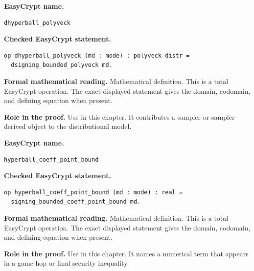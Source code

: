\begin{formaldefinition}
\noindent\textbf{EasyCrypt name.}
\begin{lstlisting}[language=EasyCrypt,basicstyle=\ttfamily\scriptsize]
dhyperball_polyveck
\end{lstlisting}
\noindent\textbf{Checked EasyCrypt statement.}
\begin{lstlisting}[language=EasyCrypt,basicstyle=\ttfamily\scriptsize]
op dhyperball_polyveck (md : mode) : polyveck distr =
  dsigning_bounded_polyveck md.
\end{lstlisting}
\noindent\textbf{Formal mathematical reading.}
Mathematical definition. This is a total EasyCrypt operation.  The exact displayed statement gives the domain, codomain, and defining equation when present.

\noindent\textbf{Role in the proof.}
Use in this chapter. It contributes a sampler or sampler-derived object to the distributional model.

\end{formaldefinition}

\begin{formaldefinition}
\noindent\textbf{EasyCrypt name.}
\begin{lstlisting}[language=EasyCrypt,basicstyle=\ttfamily\scriptsize]
hyperball_coeff_point_bound
\end{lstlisting}
\noindent\textbf{Checked EasyCrypt statement.}
\begin{lstlisting}[language=EasyCrypt,basicstyle=\ttfamily\scriptsize]
op hyperball_coeff_point_bound (md : mode) : real =
  signing_bounded_coeff_point_bound md.
\end{lstlisting}
\noindent\textbf{Formal mathematical reading.}
Mathematical definition. This is a total EasyCrypt operation.  The exact displayed statement gives the domain, codomain, and defining equation when present.

\noindent\textbf{Role in the proof.}
Use in this chapter. It names a numerical term that appears in a game-hop or final security inequality.

\end{formaldefinition}

